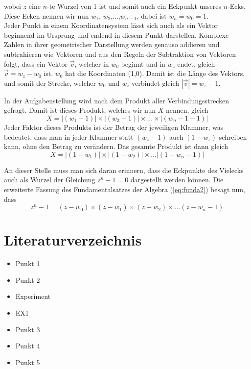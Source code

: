 \documentclass[a4paper,12pt]{article} %
\begin{document}
wobei $z$ eine $n$-te Wurzel von $1$ ist und somit auch ein Eckpunkt unseres $n$-Ecks.
Diese Ecken nennen wir nun $w_1$, $w_2$,$\dots$,$w_{n-1}$, dabei ist $w_n = w_0 = 1$.\\ 

Jeder Punkt in einem Koordinatensystem lässt sich auch als ein Vektor beginnend im Ursprung und endend in diesem Punkt darstellen. Komplexe Zahlen in ihrer geometrischer Darstellung werden genauso addieren und subtrahieren wie Vektoren und aus den Regeln der Subtraktion von Vektoren folgt, dass ein Vektor $\vec{v}$, welcher in $w_0$ beginnt und in $w_z$ endet, gleich $\vec{v}=w_z-w_0$ ist.
$w_0$ hat die Koordinaten (1,0).
Damit ist die Länge des Vektors, und somit der Strecke, welcher $w_0$ und $w_z$ verbindet gleich $|\vec{v}| = w_z - 1$.

In der Aufgabenstellung wird nach dem Produkt aller Verbindungsstrecken gefragt.
Damit ist dieses Produkt, welches wir nun $X$ nennen, gleich
\[X = |(w_1-1)|\times|(w_2-1)|\times\dots\times|(w_n-1-1)|\]
Jeder Faktor dieses Produkts ist der Betrag der jeweiligen Klammer, was bedeutet, dass man in jeder Klammer statt $(w_z-1)$ auch $(1-w_z)$ schreiben kann, ohne den Betrag zu verändern.
Das gesamte Produkt ist dann gleich 
\[X=|(1-w_1)|\times|(1-w_2)|\times\dots|(1-w_n-1)|\]

An dieser Stelle muss man sich daran erinnern, dass die Eckpunkte des Vielecks auch als Wurzel der Gleichung $z^n-1=0$ dargestellt werden können. Die erweiterte Fassung des Fundamentalsatzes der Algebra (\ref{eq:funda2}) besagt nun, dass
\[z^n-1=(z-w_0)\times(z-w_1)\times(z-w_2)\times\dots(z-w_n-1)\]



\section{Literaturverzeichnis}

\begin{itemize}
	\item Punkt 1
	\item Punkt 2
	\item Experiment
	\item EX1
	\item Punkt 3
	\item Punkt 4
	\item Punkt 5
\end{itemize}
\end{document}
